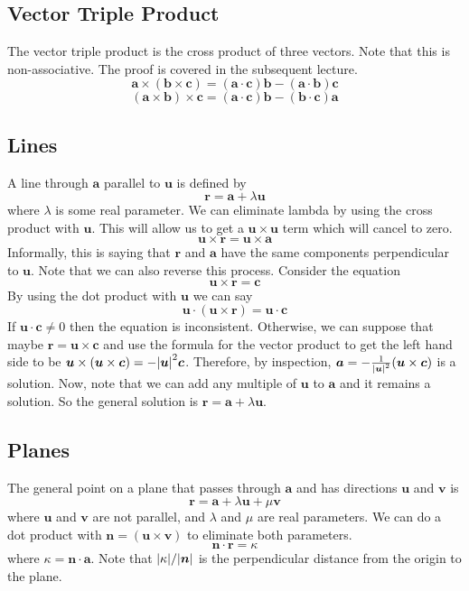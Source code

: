 \documentclass{article}
\begin{document}
\subsection{Vector Triple Product}
The vector triple product is the cross product of three vectors. Note that this is non-associative. The proof is covered in the subsequent lecture.
\[ \bm a \times (\bm b \times \bm c) = (\bm a \cdot \bm c) \bm b - (\bm a\cdot \bm b) \bm c \]
\[ (\bm a \times \bm b) \times \bm c = (\bm a \cdot \bm c) \bm b - (\bm b\cdot \bm c) \bm a \]

\subsection{Lines}
A line through $\bm a$ parallel to $\bm u$ is defined by
\[ \bm r = \bm a + \lambda \bm u \]
where $\lambda$ is some real parameter. We can eliminate lambda by using the cross product with $\bm u$. This will allow us to get a $\bm u \times \bm u$ term which will cancel to zero.
\[ \bm u \times \bm r = \bm u \times \bm a \]
Informally, this is saying that $\bm r$ and $\bm a$ have the same components perpendicular to $\bm u$. Note that we can also reverse this process. Consider the equation
\[ \bm u \times \bm r = \bm c \]
By using the dot product with $\bm u$ we can say
\[ \bm u \cdot (\bm u \times \bm r) = \bm u \cdot \bm c \]
If $\bm u \cdot \bm c \neq 0$ then the equation is inconsistent. Otherwise, we can suppose that maybe $\bm r = \bm u \times \bm c$ and use the formula for the vector product to get the left hand side to be $\bm u \times (\bm u \times \bm c) = -\abs{\bm u}^2 \bm c$. Therefore, by inspection, $\bm a = -\frac{1}{\abs{\bm u}^2}(\bm u \times \bm c)$ is a solution. Now, note that we can add any multiple of $\bm u$ to $\bm a$ and it remains a solution. So the general solution is $\bm r = \bm a + \lambda\bm u$.

\subsection{Planes}
The general point on a plane that passes through $\bm a$ and has directions $\bm u$ and $\bm v$ is
\[ \bm r = \bm a + \lambda \bm u + \mu \bm v \]
where $\bm u$ and $\bm v$ are not parallel, and $\lambda$ and $\mu$ are real parameters. We can do a dot product with $\bm n = (\bm u \times \bm v)$ to eliminate both parameters.
\[ \bm n \cdot \bm r = \kappa \]
where $\kappa = \bm n \cdot \bm a$. Note that $\abs{\kappa}/\abs{\bm n}$ is the perpendicular distance from the origin to the plane.
\end{document}
